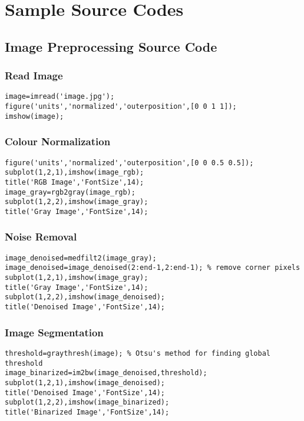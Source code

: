 \chapter{Sample Source Codes}
\section{Image Preprocessing Source Code}

\subsection*{Read Image}
\begin{lstlisting}
image=imread('image.jpg');
figure('units','normalized','outerposition',[0 0 1 1]);
imshow(image);
\end{lstlisting}

\subsection*{Colour Normalization}
\begin{lstlisting}
figure('units','normalized','outerposition',[0 0 0.5 0.5]);
subplot(1,2,1),imshow(image_rgb);
title('RGB Image','FontSize',14);
image_gray=rgb2gray(image_rgb);
subplot(1,2,2),imshow(image_gray);
title('Gray Image','FontSize',14);
\end{lstlisting}

\subsection*{Noise Removal}
\begin{lstlisting}
image_denoised=medfilt2(image_gray);
image_denoised=image_denoised(2:end-1,2:end-1); % remove corner pixels
subplot(1,2,1),imshow(image_gray);
title('Gray Image','FontSize',14);
subplot(1,2,2),imshow(image_denoised);
title('Denoised Image','FontSize',14);
\end{lstlisting}

\subsection*{Image Segmentation}
\begin{lstlisting}
threshold=graythresh(image); % Otsu's method for finding global threshold
image_binarized=im2bw(image_denoised,threshold);
subplot(1,2,1),imshow(image_denoised);
title('Denoised Image','FontSize',14);
subplot(1,2,2),imshow(image_binarized);
title('Binarized Image','FontSize',14);
\end{lstlisting}

